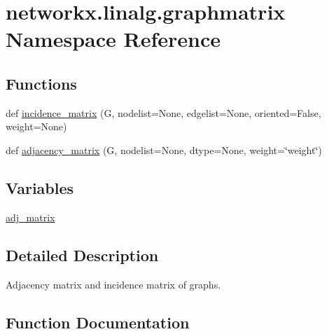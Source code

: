 \hypertarget{namespacenetworkx_1_1linalg_1_1graphmatrix}{}\section{networkx.\+linalg.\+graphmatrix Namespace Reference}
\label{namespacenetworkx_1_1linalg_1_1graphmatrix}
\subsection*{Functions}
\begin{DoxyCompactItemize}
\item 
def \hyperlink{namespacenetworkx_1_1linalg_1_1graphmatrix_adaf5556e243da34e5fba7abf1886ee7f}{incidence\+\_\+matrix} (G, nodelist=None, edgelist=None, oriented=False, weight=None)
\item 
def \hyperlink{namespacenetworkx_1_1linalg_1_1graphmatrix_a585d62b07b9294f28c58a4e9265b279d}{adjacency\+\_\+matrix} (G, nodelist=None, dtype=None, weight=\char`\"{}weight\char`\"{})
\end{DoxyCompactItemize}
\subsection*{Variables}
\begin{DoxyCompactItemize}
\item 
\hyperlink{namespacenetworkx_1_1linalg_1_1graphmatrix_a8143b2f489f4c1c82ffd1c3a67544956}{adj\+\_\+matrix}
\end{DoxyCompactItemize}


\subsection{Detailed Description}
\begin{DoxyVerb}Adjacency matrix and incidence matrix of graphs.
\end{DoxyVerb}
 

\subsection{Function Documentation}
\mbox{\label{namespacenetworkx_1_1linalg_1_1graphmatrix_a585d62b07b9294f28c58a4e9265b279d}} 
